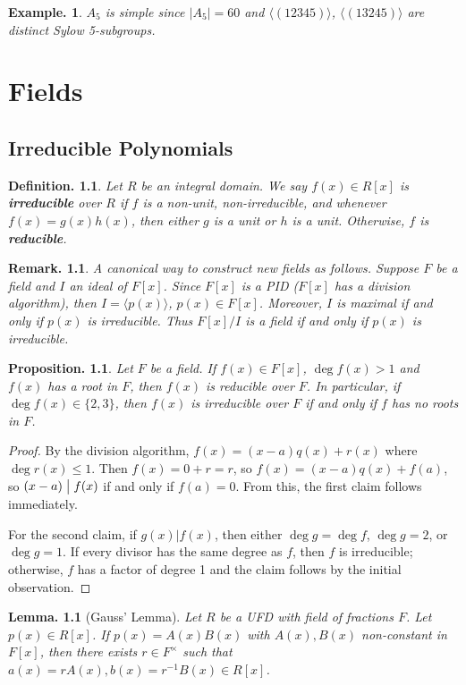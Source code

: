 \documentclass[11pt, a4paper]{memoir}
\newcommand{\mbf}[1]{{\boldmath\bfseries #1}}
\renewcommand{\div}{\bigm|}
\theoremstyle{change}
\newtheorem{lemma}[theorem]{Lemma.}
\newtheorem{proposition}[theorem]{Proposition.}
\theoremstyle{plain}
\theoremstyle{nonumberplain}
\newtheorem{definition}{Definition.}
\newtheorem{example}{Example.}
\newtheorem{remark}{Remark.}
\newtheorem{proof}{Proof}
\numberwithin{equation}{section}
\begin{document}
\begin{example}
    $A_5$ is simple since $|A_5|=60$ and $\langle(12345)\rangle$, $\langle(13245)\rangle$ are distinct Sylow 5-subgroups.
\end{example}
\chapter{Fields}
\section{Irreducible Polynomials}
\begin{definition}
    Let $R$ be an integral domain.
    We say $f(x)\in R[x]$ is \mbf{irreducible} over $R$ if $f$ is a non-unit, non-irreducible, and whenever $f(x)=g(x)h(x)$, then either $g$ is a unit or $h$ is a unit.
    Otherwise, $f$ is \mbf{reducible}.
\end{definition}
\begin{remark}
    A canonical way to construct new fields as follows.
    Suppose $F$ be a field and $I$ an ideal of $F[x]$.
    Since $F[x]$ is a PID ($F[x]$ has a division algorithm), then $I=\langle p(x)\rangle$, $p(x)\in F[x]$.
    Moreover, $I$ is maximal if and only if $p(x)$ is irreducible.
    Thus $F[x]/I$ is a field if and only if $p(x)$ is irreducible.
\end{remark}
\begin{proposition}
    Let $F$ be a field.
    If $f(x)\in F[x]$, $\deg f(x)>1$ and $f(x)$ has a root in $F$, then $f(x)$ is reducible over $F$.
    In particular, if $\deg f(x)\in\{2,3\}$, then $f(x)$ is irreducible over $F$ if and only if $f$ has no roots in $F$.
\end{proposition}
\begin{proof}
    By the division algorithm, $f(x)=(x-a)q(x)+r(x)$ where $\deg r(x)\leq 1$.
    Then $f(x)=0+r=r$, so $f(x)=(x-a)q(x)+f(a)$, so $(x-a)\div f(x)$ if and only if $f(a)=0$.
    From this, the first claim follows immediately.

    For the second claim, if $g(x)|f(x)$, then either $\deg g=\deg f$, $\deg g=2$, or $\deg g=1$.
    If every divisor has the same degree as $f$, then $f$ is irreducible; otherwise, $f$ has a factor of degree 1 and the claim follows by the initial observation.
\end{proof}
\begin{lemma}[Gauss' Lemma]
    Let $R$ be a UFD with field of fractions $F$.
    Let $p(x)\in R[x]$.
    If $p(x)=A(x)B(x)$ with $A(x),B(x)$ non-constant in $F[x]$, then there exists $r\in F^\times$ such that $a(x)=rA(x),b(x)=r^{-1}B(x)\in R[x]$.
\end{lemma}
\end{document}
